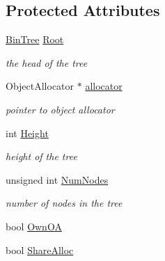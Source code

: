 \subsection*{Protected Attributes}
\begin{DoxyCompactItemize}
\item 
\hypertarget{classBSTree_acbccf64f8c26330090cbc5d8d9001195}{\hyperlink{classBSTree_ae961195e523a45be64a981840e953b67}{Bin\-Tree} \hyperlink{classBSTree_acbccf64f8c26330090cbc5d8d9001195}{Root}}\label{classBSTree_acbccf64f8c26330090cbc5d8d9001195}

\begin{DoxyCompactList}\small\item\em the head of the tree \end{DoxyCompactList}\item 
\hypertarget{classBSTree_a5e6cde514ed0ba271e1c017ed402b1f9}{Object\-Allocator $\ast$ \hyperlink{classBSTree_a5e6cde514ed0ba271e1c017ed402b1f9}{allocator}}\label{classBSTree_a5e6cde514ed0ba271e1c017ed402b1f9}

\begin{DoxyCompactList}\small\item\em pointer to object allocator \end{DoxyCompactList}\item 
\hypertarget{classBSTree_a427ba240384aabc139b442e1c8b6125c}{int \hyperlink{classBSTree_a427ba240384aabc139b442e1c8b6125c}{Height}}\label{classBSTree_a427ba240384aabc139b442e1c8b6125c}

\begin{DoxyCompactList}\small\item\em height of the tree \end{DoxyCompactList}\item 
\hypertarget{classBSTree_ae77fc08bcf3775741578e616d8f98b66}{unsigned int \hyperlink{classBSTree_ae77fc08bcf3775741578e616d8f98b66}{Num\-Nodes}}\label{classBSTree_ae77fc08bcf3775741578e616d8f98b66}

\begin{DoxyCompactList}\small\item\em number of nodes in the tree \end{DoxyCompactList}\item 
bool \hyperlink{classBSTree_afcb0096e560f0d4a7a44c23bf17883f1}{Own\-O\-A}
\item 
bool \hyperlink{classBSTree_aa93a52c804477d1683cc2197da61bc1f}{Share\-Alloc}
\end{DoxyCompactItemize}
